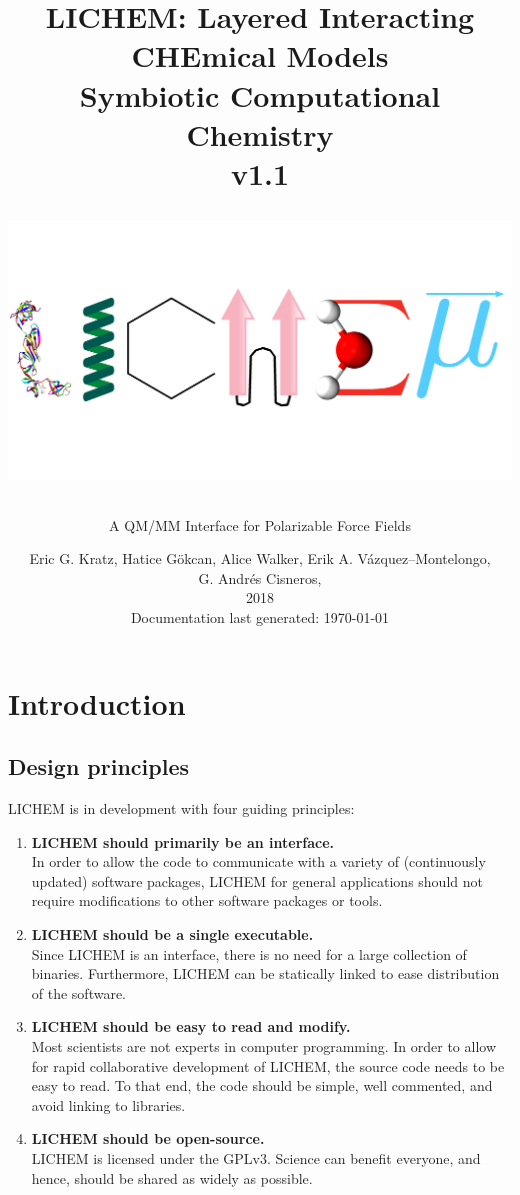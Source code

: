 \documentclass[12pt]{report}
\title{{\color{blue}LICHEM:} {\color{red}L}ayered {\color{red}I}nteracting
{\color{red}CHE}mical {\color{red}M}odels \\
Symbiotic Computational Chemistry \\
v1.1
\\ \vspace{2cm}
\begin{center}
\centering\includegraphics[width=\textwidth]{../doc/images/LICHEM_logo.png}
\end{center}}
\author{A QM/MM Interface for Polarizable Force Fields}
\date{Eric G. Kratz, Hatice G\"{o}kcan, Alice Walker,
Erik A. V\'azquez--Montelongo, \\
G. Andr\'{e}s Cisneros, \\
2018\\
\small{\vspace{0.1in}Documentation last generated: \today}
}
\begin{document}
\maketitle

\hypertarget{toc}{}
\bookmark[level=chapter,dest=toc]{\contentsname}
\tableofcontents

\clearpage{}
\label{List of Figures}
\hypertarget{lof}{}
\bookmark[level=chapter,dest=lof]{\listfigurename}
\listoffigures
\newpage

\label{List of Tables}
\hypertarget{lot}{}
\bookmark[level=chapter,dest=lot]{\listtablename}
\listoftables
\newpage

\chapter{Introduction}

\section{Design principles}

LICHEM is in development with four guiding principles: \\
\begin{enumerate}
  \item \textbf{LICHEM should primarily be an interface.} \\
  In order to allow the code to communicate with a variety of (continuously
  updated) software packages, LICHEM for general applications
  should not require modifications to other
  software packages or tools.
  
  \item \textbf{LICHEM should be a single executable.} \\
  Since LICHEM is an interface, there is no need for a large collection of
  binaries.
  Furthermore, LICHEM can be statically linked to ease distribution of the
  software.  
  
  \item \textbf{LICHEM should be easy to read and modify.} \\
  Most scientists are not experts in computer programming.
  In order to allow for rapid collaborative development of LICHEM, the source
  code needs to be easy to read.
  To that end, the code should be simple, well commented, and avoid linking to
  libraries.  

  \item \textbf{LICHEM should be open-source.} \\
  LICHEM is licensed under the GPLv3.
  Science can benefit everyone, and hence, should be shared as widely as
  possible.
\end{enumerate}
\end{document}
